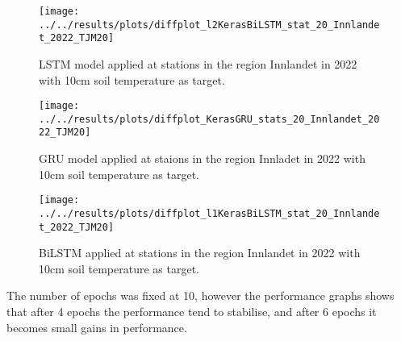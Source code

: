 \begin{figure}[H]
		\centering
		\texttt{[image: ../../results/plots/diffplot\_l2KerasBiLSTM\_stat\_20\_Innlandet\_2022\_TJM20]}
		\caption[LSTM TJM10]{LSTM model applied at stations in the region Innlandet in 2022 with 10cm soil temperature as target.}
		\label{fig:diffplotl2kerasbilstmstats10innlandet2022tjm10}
\end{figure}
\begin{figure}
		\centering
		\texttt{[image: ../../results/plots/diffplot\_KerasGRU\_stats\_20\_Innlandet\_2022\_TJM20]}
		\caption[GRU TJM10]{GRU model applied at staions in the region Innladet in 2022 with 10cm soil temperature as target.}
		\label{fig:diffplotgrustats10innlandet2022tjm10}
\end{figure}
\begin{figure}
		\centering
		\texttt{[image: ../../results/plots/diffplot\_l1KerasBiLSTM\_stat\_20\_Innlandet\_2022\_TJM20]}
		\caption[BiLSTM TJM10]{BiLSTM applied at stations in the region Innlandet in 2022 with 10cm soil temperature as target.}
		\label{fig:diffplotl1kerasbilstmstats10innlandet2022tjm10}
\end{figure}

The number of epochs was fixed at 10, however the performance graphs shows that after 4 epochs the performance tend to stabilise, and after 6 epochs it becomes small gains in performance. 



